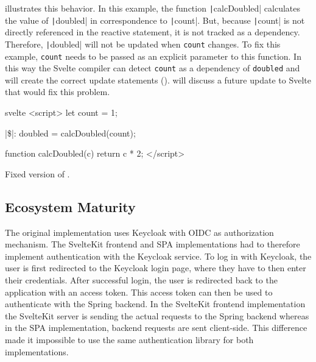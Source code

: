  illustrates this behavior. In this example, the function \texttt|calcDoubled| calculates the value of \texttt|doubled| in correspondence to \texttt|count|. But, because \texttt|count| is not directly referenced in the reactive statement, it is not tracked as a dependency. Therefore, \texttt|doubled| will not be updated when \texttt{count} changes. To fix this example, \texttt{count} needs to be passed as an explicit parameter to this function. In this way the Svelte compiler can detect \texttt{count} as a dependency of \texttt{doubled} and will create the correct update statements ().  will discuss a future update to Svelte that would fix this problem.

\begin{listing}[H]
\begin{myminted}[escapeinside=||, autogobble]{svelte}{}
<script>
  let count = 1;

  |\$|: doubled = calcDoubled(count);

  function calcDoubled(c) {
    return c * 2;
  }
</script>
\end{myminted}
\caption{Fixed version of .}
\label{fig:revaluation-reactivity-fixed}
\end{listing}

\subsection{Ecosystem Maturity}
The original implementation uses Keycloak with OIDC as authorization mechanism. The SvelteKit frontend and SPA implementations had to therefore implement authentication with the Keycloak service. To log in with Keycloak, the user is first redirected to the Keycloak login page, where they have to then enter their credentials. After successful login, the user is redirected back to the application with an access token. This access token can then be used to authenticate with the Spring backend. In the SvelteKit frontend implementation the SvelteKit server is sending the actual requests to the Spring backend whereas in the SPA implementation, backend requests are sent client-side. This difference made it impossible to use the same authentication library for both implementations. 

